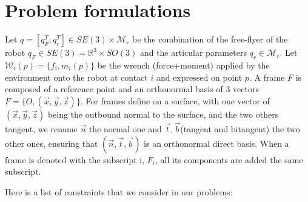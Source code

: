 \section{Problem formulations}
\label{sec:problem_formulations}

Let $q=[q_F^T; q_r^T]\in SE(3)\times \mathcal{M}_r$ be the combination of the free-flyer of the robot $q_F\in SE(3) = \mathbb{R}^3 \times SO(3)$ and the articular parameters $q_r\in\mathcal{M}_r$.
Let $\mathcal{W}_i(p)=\{f_i,m_i(p)\}$ be the wrench (force+moment) applied by the environment onto the robot at contact $i$ and expressed on point $p$.
A frame $F$ is composed of a reference point and an orthonormal basis of 3 vectors $F = \{O, (\vec{x}, \vec{y}, \vec{z})\}$.
For frames define on a surface, with one vector of $(\vec{x}, \vec{y}, \vec{z})$ being the outbound normal to the surface, and the two others tangent, we rename $\vec{n}$ the normal one and $\vec{t}, \vec{b}$(tangent and bitangent) the two other ones, ensuring that $(\vec{n}, \vec{t}, \vec{b})$ is an orthonormal direct basis.
When a frame is denoted with the subscript i, $F_i$, all its components are added the same subscript.

Here is a list of constraints that we consider in our problems:

